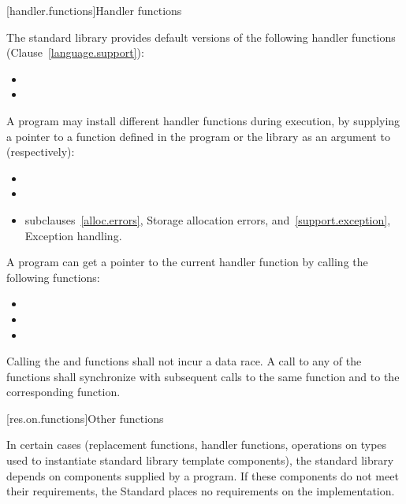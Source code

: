 [handler.functions]{Handler functions}

\pnum
The \Cpp standard library provides default versions of the following handler
functions (Clause~\ref{language.support}):

\begin{itemize}
\item
{}
%
\item
{}
%
\end{itemize}

\pnum
A \Cpp program may install different handler functions during execution, by
supplying a pointer to a function defined in the program or the library
as an argument to (respectively):

\begin{itemize}
\item
{}%
\item
{}%
\item
{}

\xref
subclauses~\ref{alloc.errors}, Storage allocation errors, and~\ref{support.exception}, 
Exception handling.
\end{itemize}

\pnum
A \Cpp program can get a pointer to the current handler function by calling the following 
functions:

\begin{itemize}
\item
{}%
\item
{}%
\item
{}
\end{itemize}

\pnum
Calling the  and  functions shall not incur a data race. A call to
any of the  functions shall synchronize with subsequent calls to the same
 function and to the corresponding  function.

[res.on.functions]{Other functions}

\pnum
In certain cases (replacement functions, handler functions, operations on types used to
instantiate standard library template components), the \Cpp standard library depends on
components supplied by a \Cpp program.
If these components do not meet their requirements, the Standard places no requirements
on the implementation.

